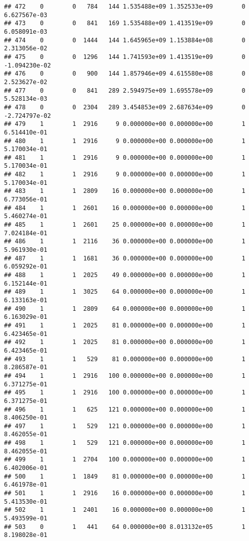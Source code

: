 \documentclass[
]{article}
\begin{document}
\begin{enumerate}
\begin{verbatim}
## 472    0        0   784   144 1.535488e+09 1.352533e+09        0  6.627567e-03
## 473    0        0   841   169 1.535488e+09 1.413519e+09        0  6.058091e-03
## 474    0        0  1444   144 1.645965e+09 1.153884e+08        0  2.313056e-02
## 475    0        0  1296   144 1.741593e+09 1.413519e+09        0 -1.094230e-02
## 476    0        0   900   144 1.857946e+09 4.615580e+08        0  2.523627e-02
## 477    0        0   841   289 2.594975e+09 1.695578e+09        0  5.528134e-03
## 478    0        0  2304   289 3.454853e+09 2.687634e+09        0 -2.724797e-02
## 479    1        1  2916     9 0.000000e+00 0.000000e+00        1  6.514410e-01
## 480    1        1  2916     9 0.000000e+00 0.000000e+00        1  5.170034e-01
## 481    1        1  2916     9 0.000000e+00 0.000000e+00        1  5.170034e-01
## 482    1        1  2916     9 0.000000e+00 0.000000e+00        1  5.170034e-01
## 483    1        1  2809    16 0.000000e+00 0.000000e+00        1  6.773056e-01
## 484    1        1  2601    16 0.000000e+00 0.000000e+00        1  5.460274e-01
## 485    1        1  2601    25 0.000000e+00 0.000000e+00        1  7.024184e-01
## 486    1        1  2116    36 0.000000e+00 0.000000e+00        1  5.961930e-01
## 487    1        1  1681    36 0.000000e+00 0.000000e+00        1  6.059292e-01
## 488    1        1  2025    49 0.000000e+00 0.000000e+00        1  6.152144e-01
## 489    1        1  3025    64 0.000000e+00 0.000000e+00        1  6.133163e-01
## 490    1        1  2809    64 0.000000e+00 0.000000e+00        1  6.163029e-01
## 491    1        1  2025    81 0.000000e+00 0.000000e+00        1  6.423465e-01
## 492    1        1  2025    81 0.000000e+00 0.000000e+00        1  6.423465e-01
## 493    1        1   529    81 0.000000e+00 0.000000e+00        1  8.286587e-01
## 494    1        1  2916   100 0.000000e+00 0.000000e+00        1  6.371275e-01
## 495    1        1  2916   100 0.000000e+00 0.000000e+00        1  6.371275e-01
## 496    1        1   625   121 0.000000e+00 0.000000e+00        1  8.406250e-01
## 497    1        1   529   121 0.000000e+00 0.000000e+00        1  8.462055e-01
## 498    1        1   529   121 0.000000e+00 0.000000e+00        1  8.462055e-01
## 499    1        1  2704   100 0.000000e+00 0.000000e+00        1  6.402006e-01
## 500    1        1  1849    81 0.000000e+00 0.000000e+00        1  6.461978e-01
## 501    1        1  2916    16 0.000000e+00 0.000000e+00        1  5.413530e-01
## 502    1        1  2401    16 0.000000e+00 0.000000e+00        1  5.493599e-01
## 503    0        1   441    64 0.000000e+00 8.013132e+05        1  8.198028e-01

\end{verbatim}
\end{enumerate}
\end{document}
